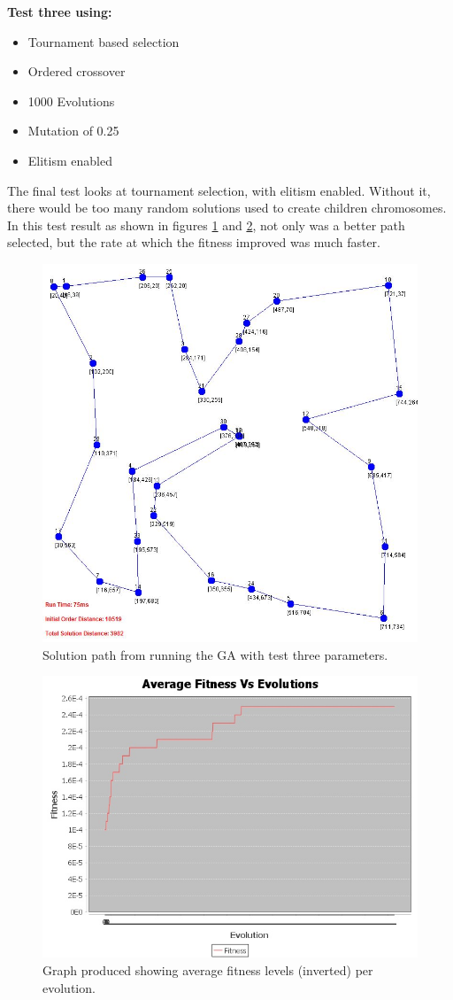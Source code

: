 \documentclass[article]{IEEEtran}
\begin{document}
\textbf{Test three using:} 
\begin{itemize}
\item Tournament based selection
\item Ordered crossover
\item 1000 Evolutions
\item Mutation of 0.25
\item Elitism enabled
\end{itemize} 

The final test looks at tournament selection, with elitism enabled. Without it, there would be too many random solutions used to create children chromosomes. In this test result as shown in figures \ref{fig:18} and \ref{fig:19}, not only was a better path selected, but the rate at which the fitness improved was much faster.

\begin{figure}[H]
\centering
\includegraphics[width=.8\linewidth]{images/test3}
\caption{Solution path from running the GA with test three parameters.}
\label{fig:18}
\end{figure}

\begin{figure}[H]
\centering
\includegraphics[width=.8\linewidth]{images/averageFitnesses3}
\caption{Graph produced showing average fitness levels (inverted) per evolution.}
\label{fig:19}
\end{figure}
\end{document}
